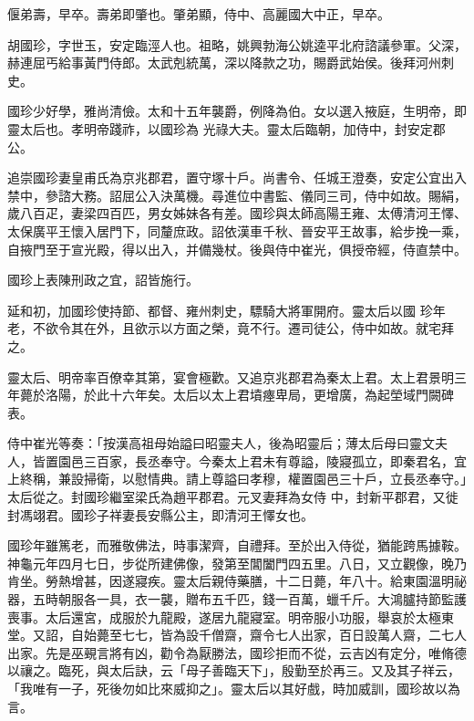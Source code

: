 \begin{pinyinscope}
 偃弟壽，早卒。壽弟即肇也。肇弟顯，侍中、高麗國大中正，早卒。



 胡國珍，字世玉，安定臨涇人也。祖略，姚興勃海公姚逵平北府諮議參軍。父深，赫連屈丐給事黃門侍郎。太武剋統萬，深以降款之功，賜爵武始侯。後拜河州刺史。



 國珍少好學，雅尚清儉。太和十五年襲爵，例降為伯。女以選入掖庭，生明帝，即靈太后也。孝明帝踐祚，以國珍為
 光祿大夫。靈太后臨朝，加侍中，封安定郡公。



 追崇國珍妻皇甫氏為京兆郡君，置守塚十戶。尚書令、任城王澄奏，安定公宜出入禁中，參諮大務。詔屈公入決萬機。尋進位中書監、儀同三司，侍中如故。賜絹，歲八百疋，妻梁四百匹，男女姊妹各有差。國珍與太師高陽王雍、太傅清河王懌、太保廣平王懷入居門下，同釐庶政。詔依漢車千秋、晉安平王故事，給步挽一乘，自掖門至于宣光殿，得以出入，并備幾杖。後與侍中崔光，俱授帝經，侍直禁中。



 國珍上表陳刑政之宜，詔皆施行。



 延和初，加國珍使持節、都督、雍州刺史，驃騎大將軍開府。靈太后以國
 珍年老，不欲令其在外，且欲示以方面之榮，竟不行。遷司徒公，侍中如故。就宅拜之。



 靈太后、明帝率百僚幸其第，宴會極歡。又追京兆郡君為秦太上君。太上君景明三年薨於洛陽，於此十六年矣。太后以太上君墳瘞卑局，更增廣，為起塋域門闕碑表。



 侍中崔光等奏：「按漢高祖母始謚曰昭靈夫人，後為昭靈后；薄太后母曰靈文夫人，皆置園邑三百家，長丞奉守。今秦太上君未有尊謚，陵寢孤立，即秦君名，宜上終稱，兼設掃衛，以慰情典。請上尊謚曰孝穆，權置園邑三十戶，立長丞奉守。」太后從之。封國珍繼室梁氏為趙平郡君。元叉妻拜為女侍
 中，封新平郡君，又徙封馮翊君。國珍子祥妻長安縣公主，即清河王懌女也。



 國珍年雖篤老，而雅敬佛法，時事潔齊，自禮拜。至於出入侍從，猶能跨馬據鞍。神龜元年四月七日，步從所建佛像，發第至閶闔門四五里。八日，又立觀像，晚乃肯坐。勞熱增甚，因遂寢疾。靈太后親侍藥膳，十二日薨，年八十。給東園溫明祕器，五時朝服各一具，衣一襲，贈布五千匹，錢一百萬，蠟千斤。大鴻臚持節監護喪事。太后還宮，成服於九龍殿，遂居九龍寢室。明帝服小功服，舉哀於太極東堂。又詔，自始薨至七七，皆為設千僧齋，齋令七人出家，百日設萬人齋，二七人
 出家。先是巫覡言將有凶，勸令為厭勝法，國珍拒而不從，云吉凶有定分，唯脩德以禳之。臨死，與太后訣，云「母子善臨天下」，殷勤至於再三。又及其子祥云，「我唯有一子，死後勿如比來威抑之」。靈太后以其好戲，時加威訓，國珍故以為言。




\end{pinyinscope}
